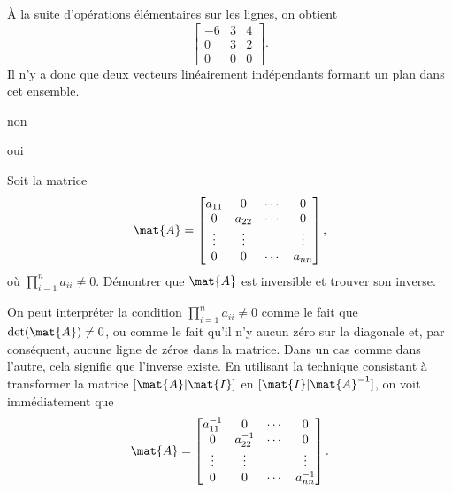 \begin{exercice}
\begin{sol}
\begin{enumerate}
      À la suite d'opérations élémentaires sur les lignes, on obtient
      \begin{displaymath}
        \begin{bmatrix}
          -6 & 3 & 4 \\ 0 & 3 & 2 \\ 0 & 0 & 0
        \end{bmatrix}.
      \end{displaymath}
      Il n'y a donc que deux vecteurs linéairement indépendants
      formant un plan dans cet ensemble.
    \end{enumerate}
  \end{sol}
  \begin{rep}
    \begin{inparaenum}
    \item non
    \item oui
    \end{inparaenum}
  \end{rep}
\end{exercice}

\begin{exercice}
  \label{ex:revision:inverse_diagonale}
  Soit la matrice
  \begin{displaymath}
    \mat{A} =
    \begin{bmatrix}
      a_{11} &      0 & \cdots &      0 \\
           0 & a_{22} & \cdots &      0 \\
      \vdots & \vdots &        & \vdots \\
           0 &      0 & \cdots & a_{nn}
    \end{bmatrix},
  \end{displaymath}
  où $\prod_{i=1}^n a_{ii} \neq 0$. Démontrer que $\mat{A}$ est
  inversible et trouver son inverse.
  \begin{sol}
    On peut interpréter la condition $\prod_{i=1}^n a_{ii} \neq 0$
    comme le fait que $\det(\mat{A}) \neq 0$, ou comme le fait qu'il
    n'y aucun zéro sur la diagonale et, par conséquent, aucune ligne
    de zéros dans la matrice. Dans un cas comme dans l'autre, cela
    signifie que l'inverse existe. En utilisant la technique
    consistant à transformer la matrice $[\mat{A}|\mat{I}]$ en
    $[\mat{I}|\mat{A}^{-1}]$, on voit immédiatement que
    \begin{displaymath}
      \mat{A} =
      \begin{bmatrix}
        a_{11}^{-1} &          0 & \cdots &      0 \\
                 0 & a_{22}^{-1} & \cdots &      0 \\
            \vdots &     \vdots &        & \vdots \\
                 0 &          0 & \cdots & a_{nn}^{-1}
      \end{bmatrix}.
    \end{displaymath}
  \end{sol}
\end{exercice}

